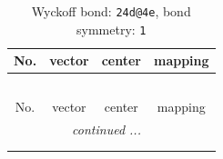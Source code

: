 \documentclass[fleqn,8pt]{jsarticle}
\begin{document}
\renewcommand{\arraystretch}{1.2}
\begin{longtable}{cccc}
\caption{Wyckoff bond: {\tt 24d@4e}, bond symmetry: {\tt 1}}
 \\
 \hline \hline
No. & vector & center & mapping \\ \hline \endfirsthead

\multicolumn{3}{l}{\tablename\ \thetable{}} \\
 \hline \hline
No. & vector & center & mapping \\ \hline \endhead

 \hline \hline
\multicolumn{3}{r}{\footnotesize\it continued ...} \\ \endfoot

 \hline \hline
\multicolumn{3}{r}{} \\ \endlastfoot


\end{longtable}
\end{document}
